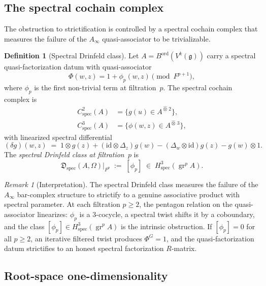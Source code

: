 \documentclass[11pt,reqno]{amsart}
\theoremstyle{definition}
\newtheorem{definition}[theorem]{Definition}
\theoremstyle{remark}
\newtheorem{remark}[theorem]{Remark}
\newcommand{\Ainf}{A_{\infty}}
\DeclareMathOperator{\gr}{gr}
\newcommand{\fg}{\mathfrak{g}}
\newcommand{\id}{\mathrm{id}}
\numberwithin{equation}{section}
\begin{document}
\subsection{The spectral cochain complex}

The obstruction to strictification is controlled by a
spectral cochain complex that measures the failure of
the $\Ainf$ quasi-associator to be trivializable.

\begin{definition}[Spectral Drinfeld class]
\label{def:dk-spectral-class}
Let $A = B^{\mathrm{ord}}(V^k(\fg))$ carry a spectral
quasi-factorization datum with quasi-associator
\[
\Phi(w,z) = 1 + \phi_p(w,z) \pmod{F^{p+1}},
\]
where $\phi_p$ is the first non-trivial term at
filtration~$p$.  The spectral cochain complex is
\begin{align*}
C^2_{\mathrm{spec}}(A) &= \{g(u) \in A^{\widehat{\otimes}\,2}\},
\\
C^3_{\mathrm{spec}}(A) &= \{\phi(w,z) \in A^{\widehat{\otimes}\,3}\},
\end{align*}
with linearized spectral differential
\begin{equation}\label{eq:dk-spectral-diff}
(\delta g)(w,z)
\;=\;
1 \otimes g(z)
+ (\id \otimes \Delta_z)g(w)
- (\Delta_w \otimes \id)g(z)
- g(w) \otimes 1.
\end{equation}
The \emph{spectral Drinfeld class at filtration~$p$} is
\begin{equation}\label{eq:dk-drinfeld-class}
\mathfrak{D}_{\mathrm{spec}}(A, \Omega)\big|_{F^p}
\;:=\;
[\phi_p]
\;\in\;
H^3_{\mathrm{spec}}(\gr^p A).
\end{equation}
\end{definition}

\begin{remark}[Interpretation]
The spectral Drinfeld class measures the failure of the
$\Ainf$ bar-complex structure to strictify to a genuine
associative product with spectral parameter.  At each
filtration $p \geq 2$, the pentagon relation on the
quasi-associator linearizes: $\phi_p$ is a $3$-cocycle,
a spectral twist shifts it by a coboundary, and the class
$[\phi_p] \in H^3_{\mathrm{spec}}(\gr^p A)$ is the
intrinsic obstruction.  If $[\phi_p] = 0$ for all
$p \geq 2$, an iterative filtered twist produces
$\Phi^G = 1$, and the quasi-factorization datum strictifies
to an honest spectral factorization $R$-matrix.
\end{remark}

\subsection{Root-space one-dimensionality}
\end{document}
